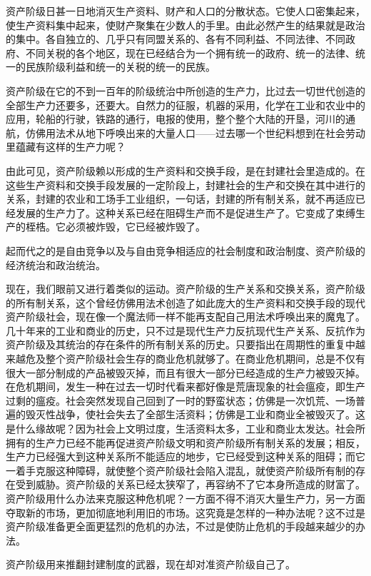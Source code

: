 \documentclass[UTF8,zihao=-4,a4paper]{ctexart}
\begin{document}
资产阶级日甚一日地消灭生产资料、财产和人口的分散状态。它使人口密集起来，使生产资料集中起来，使财产聚集在少数人的手里。由此必然产生的结果就是政治的集中。各自独立的、几乎只有同盟关系的、各有不同利益、不同法律、不同政府、不同关税的各个地区，现在已经结合为一个拥有统一的政府、统一的法律、统一的民族阶级利益和统一的关税的统一的民族。\par
资产阶级在它的不到一百年的阶级统治中所创造的生产力，比过去一切世代创造的全部生产力还要多，还要大。自然力的征服，机器的采用，化学在工业和农业中的应用，轮船的行驶，铁路的通行，电报的使用，整个整个大陆的开垦，河川的通航，仿佛用法术从地下呼唤出来的大量人口——过去哪一个世纪料想到在社会劳动里蕴藏有这样的生产力呢？\par
由此可见，资产阶级赖以形成的生产资料和交换手段，是在封建社会里造成的。在这些生产资料和交换手段发展的一定阶段上，封建社会的生产和交换在其中进行的关系，封建的农业和工场手工业组织，一句话，封建的所有制关系，就不再适应已经发展的生产力了。这种关系已经在阻碍生产而不是促进生产了。它变成了束缚生产的桎梏。它必须被炸毁，它已经被炸毁了。\par
起而代之的是自由竞争以及与自由竞争相适应的社会制度和政治制度、资产阶级的经济统治和政治统治。\par
现在，我们眼前又进行着类似的运动。资产阶级的生产关系和交换关系，资产阶级的所有制关系，这个曾经仿佛用法术创造了如此庞大的生产资料和交换手段的现代资产阶级社会，现在像一个魔法师一样不能再支配自己用法术呼唤出来的魔鬼了。几十年来的工业和商业的历史，只不过是现代生产力反抗现代生产关系、反抗作为资产阶级及其统治的存在条件的所有制关系的历史。只要指出在周期性的重复中越来越危及整个资产阶级社会生存的商业危机就够了。在商业危机期间，总是不仅有很大一部分制成的产品被毁灭掉，而且有很大一部分已经造成的生产力被毁灭掉。在危机期间，发生一种在过去一切时代看来都好像是荒唐现象的社会瘟疫，即生产过剩的瘟疫。社会突然发现自己回到了一时的野蛮状态；仿佛是一次饥荒、一场普遍的毁灭性战争，使社会失去了全部生活资料；仿佛是工业和商业全被毁灭了。这是什么缘故呢？因为社会上文明过度，生活资料太多，工业和商业太发达。社会所拥有的生产力已经不能再促进资产阶级文明和资产阶级所有制关系的发展；相反，生产力已经强大到这种关系所不能适应的地步，它已经受到这种关系的阻碍；而它一着手克服这种障碍，就使整个资产阶级社会陷入混乱，就使资产阶级所有制的存在受到威胁。资产阶级的关系已经太狭窄了，再容纳不了它本身所造成的财富了。资产阶级用什么办法来克服这种危机呢？一方面不得不消灭大量生产力，另一方面夺取新的市场，更加彻底地利用旧的市场。这究竟是怎样的一种办法呢？这不过是资产阶级准备更全面更猛烈的危机的办法，不过是使防止危机的手段越来越少的办法。\par
资产阶级用来推翻封建制度的武器，现在却对准资产阶级自己了。\par
\end{document}
